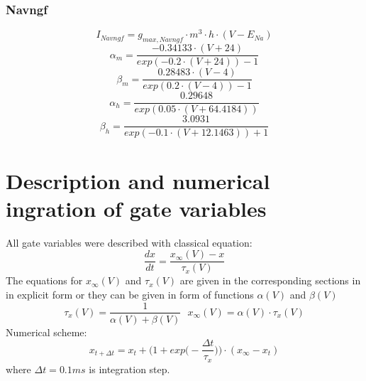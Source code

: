 \documentclass[12pt]{article}
\begin{document}
\subsubsection{Navngf}
\begin{equation}
I_{Navngf} = g_{max, Navngf} \cdot m^3 \cdot h \cdot (V - E_{Na})
\end{equation}
\begin{equation}
\alpha_m = \frac{-0.34133 \cdot (V + 24)}{exp(-0.2\cdot(V+24)) - 1}
\end{equation}
\begin{equation}
\beta_m = \frac{0.28483 \cdot (V -4)}{exp(0.2\cdot(V-4)) - 1}
\end{equation}
\begin{equation}
\alpha_h = \frac{0.29648}{exp(0.05\cdot(V+64.4184))}
\end{equation}
\begin{equation}
\beta_h = \frac{3.0931}{exp(-0.1\cdot(V+12.1463)) + 1}
\end{equation}


\section{Description and numerical ingration of gate variables}
All gate variables were described with classical equation: 
\begin{equation}
\frac{dx}{dt} = \frac{x_{\infty}(V) - x}{\tau_x(V)}
\end{equation}
The equations for $x_{\infty}(V)$ and $\tau_x(V)$ are given in the corresponding sections in in explicit form or they can be given in form of functions  $\alpha(V)$ and $\beta(V)$
\begin{equation}
\tau_x(V) =  \frac{1}{\alpha(V) + \beta(V)} \ \ \ 
x_{\infty}(V) = \alpha(V) \cdot \tau_x(V)
\end{equation}
Numerical scheme:
\begin{equation}
x_{t + \Delta t} = x_t+\Big(1 + exp \Big(-\frac{\Delta t}{\tau_x} \Big) \Big)\cdot (x_{\infty}-x_t) 
\end{equation}
where $\Delta t = 0.1 ms$ is integration step.
\end{document}
